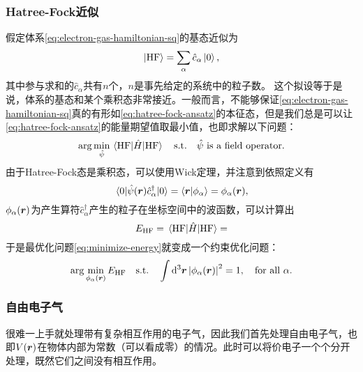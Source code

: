 \documentclass[hyperref, UTF8, a4paper]{ctexart}
\newcommand*{\suchthat}{\quad \text{s.t.} \quad}
\newcommand*{\argmin}{\arg\min}
\begin{document}
\subsubsection{Hatree-Fock近似}

假定体系\eqref{eq:electron-gas-hamiltonian-sq}的基态近似为
\begin{equation}
    \ket{\text{HF}} = \sum_\alpha \hat{c}_\alpha \ket{0},
    \label{eq:hatree-fock-ansatz}
\end{equation}
其中参与求和的$\hat{c}_\alpha$共有$n$个，$n$是事先给定的系统中的粒子数。
这个拟设等于是说，体系的基态和某个乘积态非常接近。一般而言，不能够保证\eqref{eq:electron-gas-hamiltonian-sq}真的有形如\eqref{eq:hatree-fock-ansatz}的本征态，但是我们总是可以让\eqref{eq:hatree-fock-ansatz}的能量期望值取最小值，也即求解以下问题：
\begin{equation}
    \argmin_{\hat{\psi}} \mel{\text{HF}}{\hat{H}}{\text{HF}} \suchthat \text{$\hat{\psi}$ is a field operator}.
    \label{eq:minimize-energy}
\end{equation}
由于Hatree-Fock态是乘积态，可以使用Wick定理，并注意到依照定义有
\[
    \mel{0}{\hat{\psi}(\vb*{r})\hat{c}^\dagger_\alpha}{0} = \braket{\vb*{r}}{\phi_\alpha} = \phi_\alpha(\vb*{r}),
\]
$\phi_\alpha(\vb*{r})$为产生算符$\hat{c}^\dagger_\alpha$产生的粒子在坐标空间中的波函数，可以计算出
\[
    E_\text{HF} = \mel{\text{HF}}{\hat{H}}{\text{HF}} = 
\]
于是最优化问题\eqref{eq:minimize-energy}就变成一个约束优化问题：
\[
    \argmin_{\phi_\alpha(\vb*{r})} E_\text{HF} \suchthat \int \dd[3]{\vb*{r}} \abs{\phi_\alpha(\vb*{r})}^2 = 1, \quad \text{for all $\alpha$}.
\]

\subsubsection{自由电子气}

很难一上手就处理带有复杂相互作用的电子气，因此我们首先处理自由电子气，也即$V(\vb*{r})$在物体内部为常数（可以看成零）的情况。此时可以将价电子一个个分开处理，既然它们之间没有相互作用。
\end{document}
